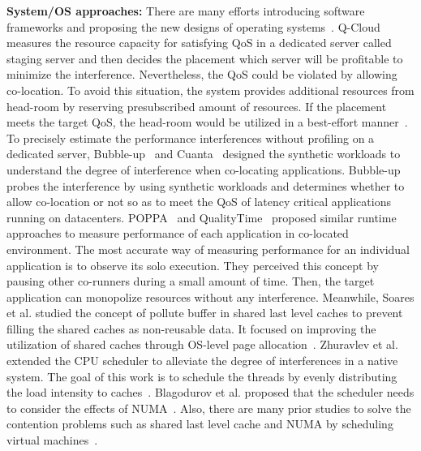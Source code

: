 \documentclass{sig-alternate}
\begin{document}
{\bf System/OS  approaches: } There are many efforts introducing software frameworks and proposing the new designs of operating systems~\cite{Govindan:2011:CQE:2038916.2038938,bubbleup,Yang:2013:BPO:2485922.2485974,Tang:2013:RRS:2451116.2451126,Nathuji:2010:QMP:1755913.1755938, Park:2013:RCH:2451116.2451137, Liu:2014:GVM:2665671.2665698}. 
Q-Cloud measures the resource capacity for satisfying QoS in a dedicated server called staging server and then decides the placement which server will be profitable to minimize the interference. Nevertheless, the QoS could be violated by allowing co-location. To avoid this situation, the system provides additional resources from head-room by reserving presubscribed amount of resources. If the placement meets the target QoS, the head-room would be utilized in a best-effort manner~\cite{Nathuji:2010:QMP:1755913.1755938}. To  precisely estimate the performance interferences without profiling on a dedicated server, Bubble-up~\cite{bubbleup} and Cuanta~\cite{Govindan:2011:CQE:2038916.2038938} designed the synthetic workloads to understand the degree of interference when co-locating applications. Bubble-up probes the interference by using synthetic workloads and determines whether to allow co-location or not so as to meet the QoS of latency critical applications running on datacenters. POPPA~\cite{fairpricing} and QualityTime~\cite{6844481} proposed similar runtime approaches to measure performance of each application in co-located environment. The most accurate way of measuring performance for an individual application is to observe its solo execution. They perceived this concept by pausing other co-runners during a small amount of time. Then, the target application can monopolize resources without any interference. Meanwhile, Soares et al. studied the concept of pollute buffer in shared last level caches to prevent filling the shared caches as non-reusable data. It focused on improving the utilization of shared caches through OS-level page allocation~\cite{Soares:2008:RHE:1521747.1521800}. Zhuravlev et al. extended the CPU scheduler to alleviate the degree of interferences in a native system. The goal of this work is to schedule the threads by evenly distributing the load intensity to caches~\cite{Zhuravlev:2010:ASR:1736020.1736036}. Blagodurov et al. proposed that the scheduler needs to consider the effects of NUMA~\cite{Blagodurov:2011:CNC:2002181.2002182}. Also, there are many prior studies to solve the contention problems such as shared last level cache and NUMA by scheduling virtual machines~\cite{Ahn:2012:DVM:2342763.2342782,6522328,Liu:2014:OVM:2665671.2665720}.
\end{document}
